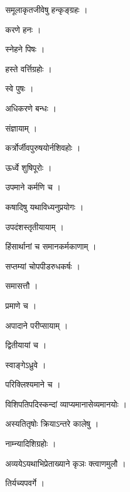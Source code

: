 \documentclass[10pt, openany, oneside]{book}
\begin{document}
\noindent समूलाकृतजीवेषु हन्कृङ्ग्रहः ।

\noindent करणे हनः ।

\noindent स्नेहने पिषः ।

\noindent हस्ते वर्त्तिग्रहोः ।

\noindent स्वे पुषः ।

\noindent अधिकरणे बन्धः ।

\noindent संज्ञायाम् ।

\noindent कर्त्रोर्जीवपुरुषयोर्नशिवहोः ।

\noindent ऊर्ध्वे शुषिपूरोः ।

\noindent उपमाने कर्मणि च ।

\noindent कषादिषु यथाविध्यनुप्रयोगः ।

\noindent उपदंशस्तृतीयायाम् ।

\noindent हिंसार्थानां च समानकर्मकाणाम् ।

\noindent सप्तम्यां चोपपीडरुधकर्षः ।

\noindent समासत्तौ ।

\noindent प्रमाणे च ।

\noindent अपादाने परीप्सायाम् ।

\noindent द्वितीयायां च ।

\noindent स्वाङ्गेऽध्रुवे ।

\noindent परिक्लिश्यमाने च ।

\noindent विशिपतिपदिस्कन्दां व्याप्यमानासेव्यमानयोः ।

\noindent अस्यतितृषोः क्रियाऽन्तरे कालेषु ।

\noindent नाम्न्यादिशिग्रहोः ।

\noindent अव्ययेऽयथाभिप्रेताख्याने कृञः क्त्वाणमुलौ ।

\noindent तिर्यच्यपवर्गे ।
\end{document}
